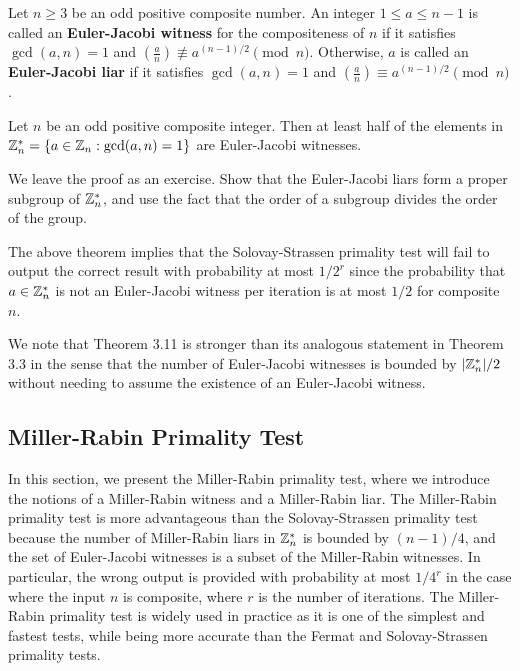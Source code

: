 \begin{defn}
Let $n \geq 3$ be an odd positive composite number. An integer $1 \leq a \leq n-1$ is called an 
{\bf Euler-Jacobi witness} for the compositeness of $n$ if it satisfies $\gcd(a, n) = 1$ and 
$\left( \frac an \right) \not\equiv a^{(n-1)/2} \pmod n$. Otherwise, $a$ is called an 
{\bf Euler-Jacobi liar} if it satisfies $\gcd(a, n) = 1$ and $\left( \frac an \right) 
\equiv a^{(n-1)/2} \pmod n$. 
\end{defn}

\begin{thm}
Let $n$ be an odd positive composite integer. Then at least half of the elements in $\mathbb{Z}_n^* 
= \{a \in \mathbb{Z}_n : \gcd(a, n) = 1\}$ are Euler-Jacobi witnesses.
\end{thm}
\begin{pf}
We leave the proof as an exercise. Show that the Euler-Jacobi liars
form a proper subgroup of $\mathbb{Z}_n^*$, and use the fact that the order of a subgroup divides the order 
of the group. 
\end{pf}

The above theorem implies that the Solovay-Strassen primality test will fail to output the 
correct result with probability at most $1/2^r$ since the probability that $a \in \mathbb{Z}_n^*$ 
is not an Euler-Jacobi witness per iteration is at most $1/2$ for composite $n$. 

We note that Theorem 3.11 is stronger than its analogous statement in Theorem 3.3 in the sense that
the number of Euler-Jacobi witnesses is bounded by $|\mathbb{Z}_n^*|/2$ without needing to assume the 
existence of an Euler-Jacobi witness. 

\subsection{Miller-Rabin Primality Test}

In this section, we present the Miller-Rabin primality test, where we introduce the notions of a Miller-Rabin witness and a Miller-Rabin liar. The Miller-Rabin primality test is more advantageous than the Solovay-Strassen primality test because the number of Miller-Rabin liars in $\mathbb{Z}_n^*$ is bounded by $(n-1)/4$, and the set of Euler-Jacobi witnesses is a subset of 
the Miller-Rabin witnesses. In particular, the wrong output is provided with probability at most 
$1/4^r$ in the case where the input $n$ is composite, where $r$ is the number of iterations. 
The Miller-Rabin primality test is widely used in practice as it is one of the simplest and 
fastest tests, while being more accurate than the Fermat and Solovay-Strassen primality tests. 

